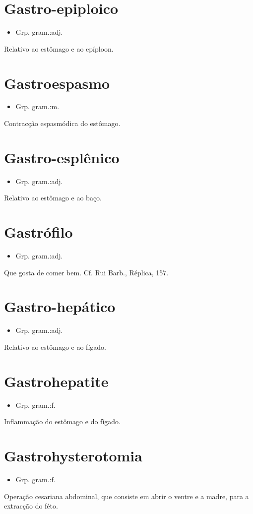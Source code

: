 \section{Gastro-epiploico}
\begin{itemize}
\item {Grp. gram.:adj.}
\end{itemize}
Relativo ao estômago e ao epíploon.
\section{Gastroespasmo}
\begin{itemize}
\item {Grp. gram.:m.}
\end{itemize}
Contracção espasmódica do estômago.
\section{Gastro-esplênico}
\begin{itemize}
\item {Grp. gram.:adj.}
\end{itemize}
Relativo ao estômago e ao baço.
\section{Gastrófilo}
\begin{itemize}
\item {Grp. gram.:adj.}
\end{itemize}
Que gosta de comer bem. Cf. Rui Barb., \textunderscore Réplica\textunderscore , 157.
\section{Gastro-hepático}
\begin{itemize}
\item {Grp. gram.:adj.}
\end{itemize}
Relativo ao estômago e ao fígado.
\section{Gastrohepatite}
\begin{itemize}
\item {Grp. gram.:f.}
\end{itemize}
Inflammação do estômago e do fígado.
\section{Gastrohysterotomia}
\begin{itemize}
\item {Grp. gram.:f.}
\end{itemize}
Operação cesariana abdominal, que consiste em abrir o ventre e a madre, para a extracção do féto.
